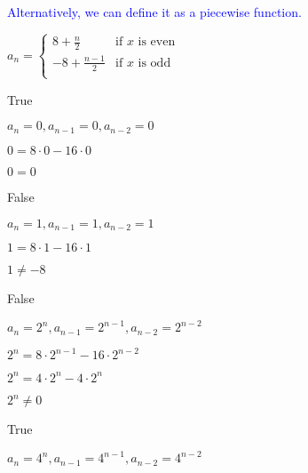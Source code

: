\documentclass{exam}
\begin{document}
\begin{questions}
\begin{subparts}
\begin{center}
\vspace{5px}
\textcolor{blue}{Alternatively, we can define it as a piecewise function.}

\(a_n = 
	\begin{cases}
        8+\frac{n}{2} & \text{if } x \text{ is even}\\
        -8+\frac{n-1}{2} & \text{if } x \text{ is odd}\\
    \end{cases}
\)

\end{center}

\end{subparts}

\begin{subparts}

\begin{center}
True

\( a_n = 0, a_{n-1} = 0, a_{n-2} = 0 \)

\( 0 = 8 \cdot 0 - 16 \cdot 0 \)

\( 0 = 0\)
\end{center}


\begin{center}
False

\( a_n = 1, a_{n-1} = 1, a_{n-2} = 1 \)

\( 1 = 8 \cdot 1 - 16 \cdot 1 \)

\( 1 \neq -8\)
\end{center}


\begin{center}
False

\( a_n = 2^n, a_{n-1} = 2^{n-1}, a_{n-2} = 2^{n-2} \)

\( 2^n = 8 \cdot 2^{n-1} - 16 \cdot 2^{n-2} \)

\( 2^n = 4 \cdot 2^{n} - 4 \cdot 2^{n} \)

\( 2^n \neq 0 \)

\end{center}


\begin{center}
True

\( a_n = 4^n, a_{n-1} = 4^{n-1}, a_{n-2} = 4^{n-2} \)


\end{center}
\end{subparts}
\end{questions}
\end{document}
